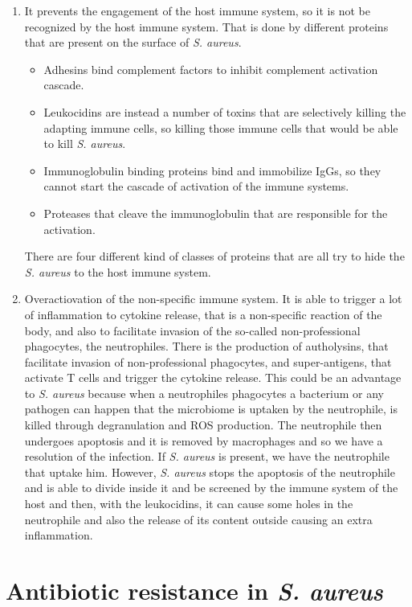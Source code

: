 \begin{enumerate}
    \item It prevents the engagement of the host immune system, so it is not be recognized by the host immune system. That is done by different proteins that are present on the  surface of \emph{S. aureus}.
    \begin{itemize}
        \item Adhesins bind complement factors to inhibit complement activation cascade.
        \item Leukocidins are instead a number of toxins that are selectively killing the adapting immune cells, so killing those immune cells that would be able to kill \emph{S. aureus}. 
        \item Immunoglobulin binding proteins bind and immobilize IgGs, so they cannot start the cascade of activation of the immune systems.
        \item Proteases that cleave the immunoglobulin that are responsible for the activation.
    \end{itemize}
    There are four different kind of classes of proteins that are all try to hide the \emph{S. aureus} to the host immune system. 
    \item Overactiovation of the non-specific immune system. It is able to trigger a lot of inflammation to cytokine release, that is a non-specific reaction of the body, and also to facilitate invasion of the so-called non-professional phagocytes, the neutrophiles. There is the production of autholysins, that facilitate invasion of non-professional phagocytes, and super-antigens, that activate T cells and trigger the cytokine release. This could be an advantage to \emph{S. aureus} because when a neutrophiles phagocytes a bacterium or any pathogen can happen that the microbiome is uptaken by the neutrophile, is killed through degranulation and ROS production. The neutrophile then undergoes apoptosis and it is removed by macrophages and so we have a resolution of the infection. 
    If \emph{S. aureus} is present, we have the neutrophile that uptake him. However, \emph{S. aureus} stops the apoptosis of the neutrophile and is able to divide inside it and be screened by the immune system of the host and then, with the leukocidins, it can cause some holes in the neutrophile and also the release of its content outside causing an extra inflammation. 
\end{enumerate}

\section{Antibiotic resistance in \emph{S. aureus}}

